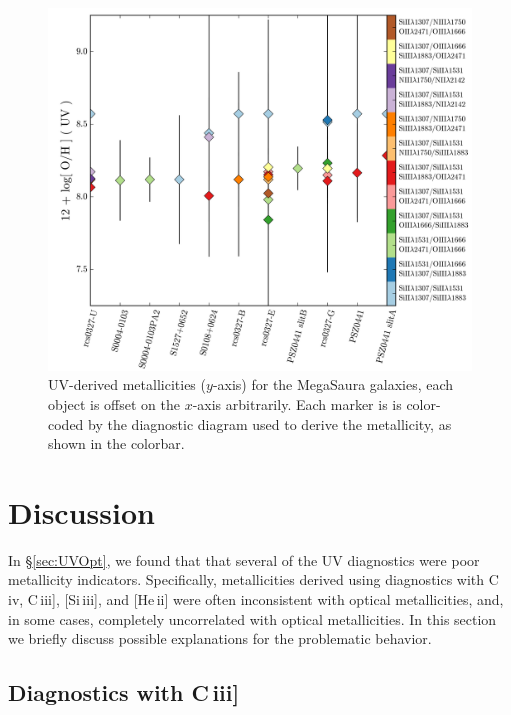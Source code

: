 \documentclass[preprint2]{aastex62}
\newcommand{\heii}{[He\,{\sc ii}]\xspace}
\newcommand{\civ}{C\,{\sc iv}\xspace}
\newcommand{\SiuIII}{[Si\,{\sc iii}]\xspace}
\newcommand{\ciii}{C\,{\sc iii}]\xspace}
\newcommand{\mage}{{\sc Meg}a{\sc S}a{\sc ura}\xspace}
\begin{document}
\begin{figure}
  \begin{center}
    \includegraphics[width=\linewidth]{figs/f8.png}
    \caption{UV-derived metallicities ($y$-axis) for the \mage galaxies, each object is offset on the $x$-axis arbitrarily. Each marker is is color-coded by the diagnostic diagram used to derive the metallicity, as shown in the colorbar. }
    \label{fig:UVmage}
  \end{center}
\end{figure}


\section{Discussion}\label{sec:discussion}

In \S\ref{sec:UVOpt}, we found that that several of the UV diagnostics were poor metallicity indicators. Specifically, metallicities derived using diagnostics with \civ, \ciii, \SiuIII, and \heii were often inconsistent with optical metallicities, and, in some cases, completely uncorrelated with optical metallicities. In this section we briefly discuss possible explanations for the problematic behavior.

\subsection{Diagnostics with \ciii}
\end{document}
